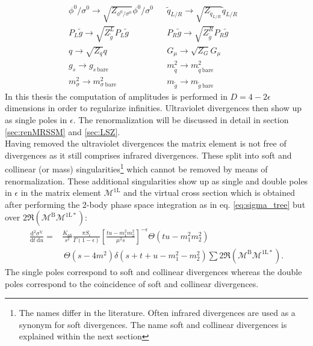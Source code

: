 \begin{align}
& \phi^0 / \sigma^0 \to \sqrt{Z_{\phi^0 / \sigma^0}}\phi^0 / \sigma^0 && \tilde{q}_{L/R} \to \sqrt{Z_{\tilde{q}_{L/R}}}\tilde{q}_{L/R}\nonumber\\
& P_L \tilde{g} \to \sqrt{Z_{\tilde{g}}^L} P_L \tilde{g} && P_R \tilde{g} \to \sqrt{Z_{\tilde{g}}^R} P_R \tilde{g}\nonumber\\
& q \to \sqrt{Z_q}q && G_\mu \to \sqrt{Z_G} G_\mu && \label{eq:fieldtrafo}\\
& g_s \to g_{s\ \mathrm{bare}} && m_{\tilde{q}}^2 \to m_{\tilde{q}\ \mathrm{bare}}^2\nonumber\\
&  m_{\sigma}^2 \to m_{\sigma\ \mathrm{bare}}^2 && m_{\tilde{g}} \to m_{\tilde{g}\ \mathrm{bare}}\label{eq:parametertrafo}
\end{align}
In this thesis the computation of amplitudes is performed in $D = 4-2\epsilon$ dimensions in order to regularize infinities. Ultraviolet divergences then show up as single poles in $\epsilon$. The renormalization will be discussed in detail in section \ref{sec:renMRSSM} and \ref{sec:LSZ}.\\
Having removed the ultraviolet divergences the matrix element is not free of divergences as it still comprises infrared divergences. These split into soft and collinear (or mass) singularities\footnote{The names differ in the literature. Often infrared divergences are used as a synonym for soft divergences. The name soft and collinear divergences is explained within the next section} which cannot be removed by means of renormalization. These additional singularities show up as single and double poles in $\epsilon$ in the matrix element $\mathcal{M^{\mathrm{1L}}}$ and the virtual cross section which is obtained after performing the 2-body phase space integration as in eq. \eqref{eq:sigma_tree} but over $2 \Re \left( \mathcal{M}^{\mathrm{B}} \mathcal{M}^{\mathrm{1L}\ast} \right)$:
\begin{align}
\frac{\mbox{d}^2 \sigma^{\mathrm{V}}}{\mbox{d}t\ \mbox{d}u} =& \frac{K_{ab}}{s^2} \frac{\pi S_{\epsilon}}{\Gamma(1-\epsilon)} \left[ \frac{tu-m_1^2m_2^2}{\mu^2 s}\right]^{-\epsilon} \Theta(tu-m_1^2m_2^2)\nonumber\\
&\ \Theta(s-4m^2) \delta(s+t+u-m_1^2-m_2^2) \sum 2 \Re \left( \mathcal{M}^{\mathrm{B}} \mathcal{M}^{\mathrm{1L}\ast} \right).\label{eq:diffsigma}
\end{align}
The single poles correspond to soft and collinear divergences whereas the double poles correspond to the coincidence of soft and collinear divergences.


